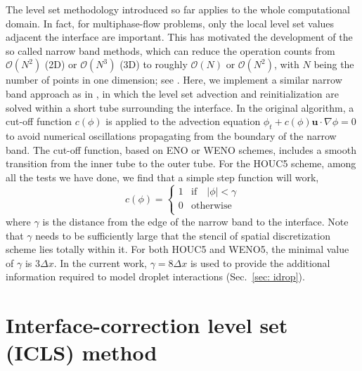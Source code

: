 The level set methodology introduced so far applies to the whole computational domain. In fact, for multiphase-flow problems, only the local level set values adjacent the interface are important. This has motivated the development of the so called narrow band methods, which can reduce the operation counts from $\mathcal{O}(N^2)$ (2D) or $\mathcal{O}(N^3)$ (3D) to roughly $\mathcal{O}(N)$ or $\mathcal{O}(N^2)$, with $N$ being the number of points in one dimension; see \eg \cite{Adalsteinsson_JCP_1995, Peng_JCP_1999}. Here, we implement a similar narrow band approach as in \cite{Peng_JCP_1999}, in which the level set advection and reinitialization are solved within a short tube surrounding the interface. In the original algorithm, a cut-off function $c(\phi)$ is applied to the advection equation $\phi_t+c(\phi){\bm u}\cdot \nabla \phi=0$ to avoid numerical oscillations propagating from the boundary of the narrow band. The cut-off function, based on ENO or WENO schemes, includes a smooth transition from the inner tube to the outer tube. For the HOUC5 scheme, among all the tests we have done, we find that a simple step function will work, \ie
\begin{equation}
  c(\phi) =
  \begin{cases}
     1 & \textrm{if} \quad  |\phi| < \gamma \\
     0 & \textrm{otherwise} \\
  \end{cases}
  \label{NB cut-off}
\end{equation}
\noindent where $\gamma$ is the distance from the edge of the narrow band to the interface. Note that $\gamma$ needs to be sufficiently large that the stencil of spatial discretization scheme lies totally within it. For both HOUC5 and WENO5, the minimal value of $\gamma$ is $3\Delta x$. In the current work, $\gamma= 8\Delta x$ is used to provide  the additional information required to model droplet interactions (Sec.\ \ref{sec: idrop}). %

\fi



\section{Interface-correction level set (ICLS) method}
\label{subsec: ICLS}


